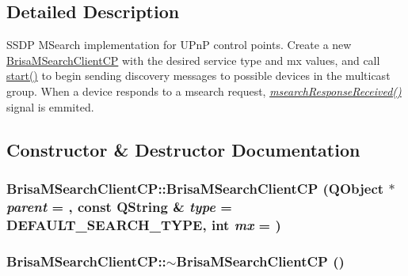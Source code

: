 \subsection{Detailed Description}
SSDP MSearch implementation for UPnP control points. Create a new \hyperlink{classBrisaUpnp_1_1BrisaMSearchClientCP}{BrisaMSearchClientCP} with the desired service type and mx values, and call \hyperlink{classBrisaUpnp_1_1BrisaMSearchClientCP_a6b1b90d6f85a8fac4f90166c45524a26}{start()} to begin sending discovery messages to possible devices in the multicast group. When a device responds to a msearch request, {\itshape \hyperlink{classBrisaUpnp_1_1BrisaMSearchClientCP_abebd58a64a0cb18679d40ce2e0ca76a2}{msearchResponseReceived()}\/} signal is emmited. 

\subsection{Constructor \& Destructor Documentation}
\hypertarget{classBrisaUpnp_1_1BrisaMSearchClientCP_af2b7857c157d23ebe127ef44f64cce67}{
\subsubsection[{BrisaMSearchClientCP}]{\setlength{\rightskip}{0pt plus 5cm}BrisaMSearchClientCP::BrisaMSearchClientCP (QObject $\ast$ {\em parent} = {}, \/  const QString \& {\em type} = {\ttfamily DEFAULT\_\-SEARCH\_\-TYPE}, \/  int {\em mx} = {})}}
\label{classBrisaUpnp_1_1BrisaMSearchClientCP_af2b7857c157d23ebe127ef44f64cce67}
\hypertarget{classBrisaUpnp_1_1BrisaMSearchClientCP_a6d337525aebcfd7a769905e4e28322ff}{
\subsubsection[{$\sim$BrisaMSearchClientCP}]{\setlength{\rightskip}{0pt plus 5cm}BrisaMSearchClientCP::$\sim$BrisaMSearchClientCP ()}}
\label{classBrisaUpnp_1_1BrisaMSearchClientCP_a6d337525aebcfd7a769905e4e28322ff}



